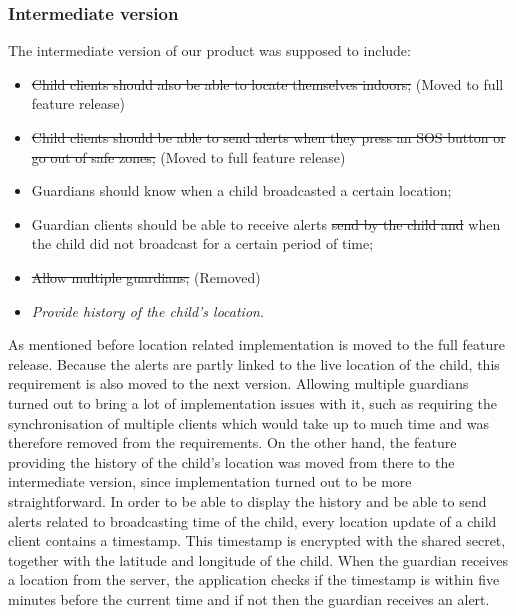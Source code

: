 \documentclass[a4paper]{article}
\begin{document}
\subsubsection{Intermediate version}
The intermediate version of our product was supposed to include:
\begin{itemize}
    \item \sout{Child clients should also be able to locate themselves indoors;} (Moved to full feature release)
    \item \sout{Child clients should be able to send alerts when they press an SOS button or go out of safe zones;} (Moved to full feature release)
    \item Guardians should know when a child broadcasted a certain location;
    \item Guardian clients should be able to receive alerts \sout{send by the child and} when the child did not broadcast for a certain period of time;
    \item \sout{Allow multiple guardians;} (Removed)
    \item \emph{Provide history of the child's location}.
\end{itemize}
As mentioned before location related implementation is moved to the full feature release. Because the alerts are partly linked to the live location of the child, this requirement is also moved to the next version. Allowing multiple guardians turned out to bring a lot of implementation issues with it, such as requiring the synchronisation of multiple clients which would take up to much time and was therefore removed from the requirements. On the other hand, the feature providing the history of the child's location was moved from there to the intermediate version, since implementation turned out to be more straightforward. In order to be able to display the history and be able to send alerts related to broadcasting time of the child, every location update of a child client contains a timestamp. This timestamp is encrypted with the shared secret, together with the latitude and longitude of the child. When the guardian receives a location from the server, the application checks if the timestamp is within five minutes before the current time and if not then the guardian receives an alert. 
\end{document}
